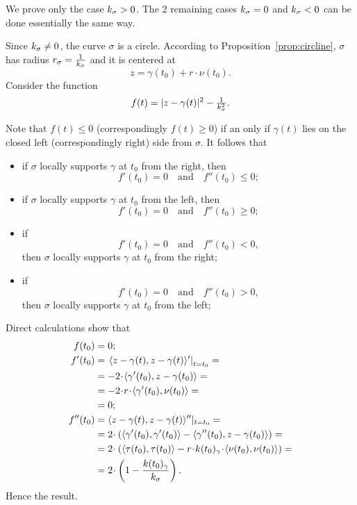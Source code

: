 
We prove only the case $k_\sigma>0$.
The 2 remaining cases $k_\sigma=0$ and $k_\sigma<0$ can be done essentially the same way.

Since $k_\sigma\ne0$, the curve $\sigma$ is a circle.
According to Proposition~\ref{prop:circline},
$\sigma$ has radius $r_\sigma=\tfrac1{k_\sigma}$ and it is centered at 
\[z=\gamma(t_0)+r\cdot\nu(t_0).\]
Consider the function 
\[f(t)=|z-\gamma(t)|^2-\tfrac1{k_\sigma^2}.\]

Note that $f(t)\le0$ (correspondingly $f(t)\ge0$) 
if an only if $\gamma(t)$ lies on the closed left (correspondingly right) side from $\sigma$.
It follows that 
\begin{itemize}
\item if $\sigma$ locally supports $\gamma$ at $t_0$ from the right, 
then
\[f'(t_0)=0\quad\text{and}\quad f''(t_0)\le 0;\]

\item if $\sigma$ locally supports $\gamma$ at $t_0$ from  the left, 
then 
\[f'(t_0)=0\quad\text{and}\quad f''(t_0)\ge 0;\]

\item if 
\[f'(t_0)=0\quad\text{and}\quad f''(t_0)< 0,\]
then $\sigma$ locally supports $\gamma$ at $t_0$ from  the right;

\item if 
\[f'(t_0)=0\quad\text{and}\quad f''(t_0)> 0,\] then $\sigma$ locally supports $\gamma$ at $t_0$ from  the left;
\end{itemize}

Direct calculations show that
\begin{align*}
f(t_0)&=0;
\\
f'(t_0)&=\left.\langle z-\gamma(t),z-\gamma(t) \rangle'\right|_{t=t_0}=
\\
&=-2\cdot \langle \gamma'(t_0),z-\gamma(t_0) \rangle=
\\&=-2\cdot r\cdot \langle \gamma'(t_0),\nu(t_0) \rangle=
\\
&=0;
\\
f''(t_0)&=\langle z-\gamma(t),z-\gamma(t) \rangle''|_{t=t_0}=
\\
&=2\cdot\left( \langle \gamma'(t_0),\gamma'(t_0) \rangle-\langle \gamma''(t_0),z-\gamma(t_0) \rangle \right)=
\\
&=2\cdot\left( \langle \tau(t_0),\tau(t_0) \rangle-r\cdot\kur(t_0)_\gamma\cdot \langle \nu(t_0),\nu(t_0) \rangle \right)=
\\
&=2\cdot\left(1- \frac{\kur(t_0)_\gamma}{\kur_\sigma}\right).
\end{align*}
Hence the result.\qeds


